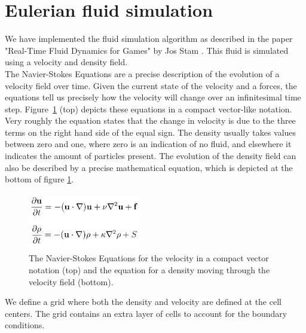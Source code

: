 \section{Eulerian fluid simulation}

We have implemented the fluid simulation algorithm as described in the paper "Real-Time Fluid Dynamics for Games" by Jos Stam \cite{stable}.
This fluid is simulated using a velocity and density field.\\
The Navier-Stokes Equations are a precise description of the evolution of a velocity field over time.
Given the current state of the velocity and a forces, the equations tell us precisely how the velocity will change over an infinitesimal time step.
Figure~\ref{fig:navierstokes} (top) depicts these equations in a compact vector-like notation.\\
Very roughly the equation states that the change in velocity is due to the three terms on the right hand side of the equal sign. The density usually takes values between zero and one, where zero is an indication of no fluid, and elsewhere it indicates the amount of particles present. The evolution of the density field can also be described by a precise mathematical equation, which is depicted at the bottom of figure \ref{fig:navierstokes}.\\
\begin{figure}[H]
    \centering
    \includegraphics[width=5cm]{img/navierstokes.png}
    \caption{The Navier-Stokes Equations for the velocity in a compact vector notation (top) and the equation for a density moving through the velocity field (bottom).}
    \label{fig:navierstokes}
\end{figure}
We define a grid where both the density and velocity are defined at the cell centers. The grid contains an extra layer of cells to account for the boundary conditions.

